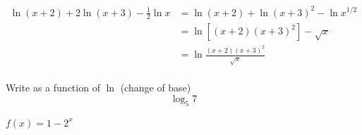 \documentclass[fleqn,addpoints]{exam}
\begin{document}
\begin{questions}
\begin{parts}
      \end{parts}

      \begin{solution}
        \begin{align*}
          \ln (x + 2) + 2 \ln (x + 3) - \frac{1}{2} \ln x & = \ln (x + 2) + \ln (x + 3)^2 - \ln x^{1/2} \\
                                                          & = \ln \left[ (x + 2)(x + 3)^2 \right] - \sqrt{x} \\
                                                          & = \ln \frac{ (x + 2)(x + 3)^2 }{\sqrt{x}} \\
        \end{align*}
      \end{solution}

    \question[3] Write as a function of $\ln$ (change of base)
      \[
        \log_5 7
      \]

    \question $f(x) = 1 - 2^x$
\end{questions}
\end{document}
